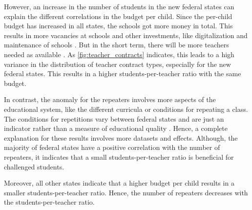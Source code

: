 However,  an increase in the number of students in the new federal states can explain the different correlations in the budget per child. Since the per-child budget has increased in all states, the schools got more money in total. This results in more vacancies at schools \cite{kultusminister_konferenz_lehrkrafteeinstellungsbedarf_2023} and other investments, like digitalization and maintenance of schools \cite{bundesministerium_fur_bildung_und_forschung_fortschrittsbericht_2022}. But in the short term, there will be more teachers needed as available \cite{kultusminister_konferenz_lehrkrafteeinstellungsbedarf_2023}. As \autoref{fig:teacher_contracts} indicates, this leads to a high variance in the distribution of teacher contract types, especially for the new federal states. This results in a higher students-per-teacher ratio with the same budget.

In contrast, the anomaly for the repeaters involves more aspects of the educational system, like the different curricula or conditions for repeating a class. The conditions for repetitions vary between federal states and are just an indicator rather than a measure of educational quality \cite{klemm_klassenwiederholungen_2009}. Hence, a complete explanation for these results involves more datasets and effects. Although, the majority of federal states have a positive correlation with the number of repeaters, it indicates that a small students-per-teacher ratio is beneficial for challenged students.

Moreover, all other states indicate that a higher budget per child results in a smaller students-per-teacher ratio. Hence, the number of repeaters decreases with the students-per-teacher ratio.